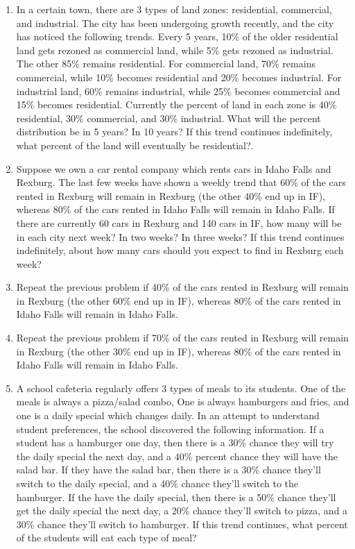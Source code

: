 \begin{enumerate}
\begin{enumerate}
\item In a certain town, there are 3 types of land zones: residential, commercial, and industrial. The city has been undergoing growth recently, and the city has noticed the following trends.  Every 5 years, 10\% of the older residential land gets rezoned as commercial land, while 5\% gets rezoned as industrial.  The other 85\% remains residential.  For commercial land, 70\% remains commercial, while 10\% becomes residential and 20\% becomes industrial. For industrial land, 60\% remains industrial, while 25\% becomes commercial and 15\% becomes residential. Currently the percent of land in each zone is 40\% residential, 30\% commercial, and 30\% industrial. What will the percent distribution be in 5 years? In 10 years?  If this trend continues indefinitely, what percent of the land will eventually be residential?. 
\item Suppose we own a car rental company which rents cars in Idaho Falls and Rexburg. The last few weeks have shown a weekly trend that 60\% of the cars rented in Rexburg will remain in Rexburg (the other 40\% end up in IF), whereas 80\% of the cars rented in Idaho Falls will remain in Idaho Falls. If there are currently 60 cars in Rexburg and 140 cars in IF, how many will be in each city next week?  In two weeks? In three weeks? If this trend continues indefinitely, about how many cars should you expect to find in Rexburg each week?
\item Repeat the previous problem if 40\% of the cars rented in Rexburg will remain in Rexburg (the other 60\% end up in IF), whereas 80\% of the cars rented in Idaho Falls will remain in Idaho Falls.
\item Repeat the previous problem if 70\% of the cars rented in Rexburg will remain in Rexburg (the other 30\% end up in IF), whereas 80\% of the cars rented in Idaho Falls will remain in Idaho Falls.
\item A school cafeteria regularly offers 3 types of meals to its students. One of the meals is always a pizza/salad combo, One is always hamburgers and fries, and one is a daily special which changes daily. In an attempt to understand student preferences, the school discovered the following information. If a student has a hamburger one day, then there is a 30\% chance they will try the daily special the next day, and a 40\% percent chance they will have the salad bar.  If they have the salad bar, then there is a 30\% chance they'll switch to the daily special, and a 40\% chance they'll switch to the hamburger.  If the have the daily special, then there is a 50\% chance they'll get the daily special the next day, a 20\% chance they'll switch to pizza, and a 30\% chance they'll switch to hamburger.  If this trend continues, what percent of the students will eat each type of meal? 


\end{enumerate}
\end{enumerate}
